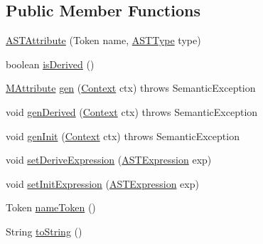 \subsection*{Public Member Functions}
\begin{DoxyCompactItemize}
\item 
\hyperlink{classorg_1_1tzi_1_1use_1_1parser_1_1use_1_1_a_s_t_attribute_ab2ef5b9ae96526d372058e0f09cc788f}{A\-S\-T\-Attribute} (Token name, \hyperlink{classorg_1_1tzi_1_1use_1_1parser_1_1ocl_1_1_a_s_t_type}{A\-S\-T\-Type} type)
\item 
boolean \hyperlink{classorg_1_1tzi_1_1use_1_1parser_1_1use_1_1_a_s_t_attribute_ae5f8753c5081602dfd242fbb4e52bdb3}{is\-Derived} ()
\item 
\hyperlink{classorg_1_1tzi_1_1use_1_1uml_1_1mm_1_1_m_attribute}{M\-Attribute} \hyperlink{classorg_1_1tzi_1_1use_1_1parser_1_1use_1_1_a_s_t_attribute_abbdc3dddf46bef1c8b9a3180e8fe779a}{gen} (\hyperlink{classorg_1_1tzi_1_1use_1_1parser_1_1_context}{Context} ctx)  throws Semantic\-Exception 
\item 
void \hyperlink{classorg_1_1tzi_1_1use_1_1parser_1_1use_1_1_a_s_t_attribute_a5f7f405931dc80e8a30f9b8a88b146b5}{gen\-Derived} (\hyperlink{classorg_1_1tzi_1_1use_1_1parser_1_1_context}{Context} ctx)  throws Semantic\-Exception 
\item 
void \hyperlink{classorg_1_1tzi_1_1use_1_1parser_1_1use_1_1_a_s_t_attribute_aae49aa8e80ed69270f92a58d5210ab76}{gen\-Init} (\hyperlink{classorg_1_1tzi_1_1use_1_1parser_1_1_context}{Context} ctx)  throws Semantic\-Exception 
\item 
void \hyperlink{classorg_1_1tzi_1_1use_1_1parser_1_1use_1_1_a_s_t_attribute_a47658998333a4189413d5bd8abed95ca}{set\-Derive\-Expression} (\hyperlink{classorg_1_1tzi_1_1use_1_1parser_1_1ocl_1_1_a_s_t_expression}{A\-S\-T\-Expression} exp)
\item 
void \hyperlink{classorg_1_1tzi_1_1use_1_1parser_1_1use_1_1_a_s_t_attribute_ad5e4d604f8be53a14ec44d2b7fba74b8}{set\-Init\-Expression} (\hyperlink{classorg_1_1tzi_1_1use_1_1parser_1_1ocl_1_1_a_s_t_expression}{A\-S\-T\-Expression} exp)
\item 
Token \hyperlink{classorg_1_1tzi_1_1use_1_1parser_1_1use_1_1_a_s_t_attribute_ad2e43bfb210290544fcd13e294684ce6}{name\-Token} ()
\item 
String \hyperlink{classorg_1_1tzi_1_1use_1_1parser_1_1use_1_1_a_s_t_attribute_a8842e39cde2a399e34a3d7b7daac5eda}{to\-String} ()
\end{DoxyCompactItemize}


